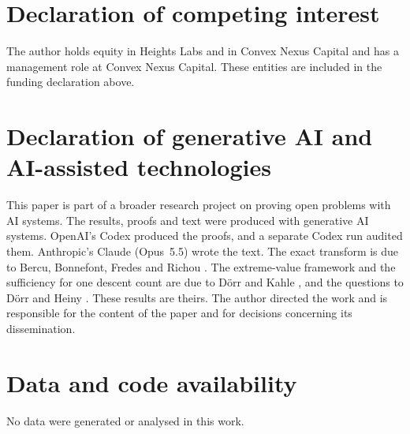\documentclass[11pt]{amsart}
\theoremstyle{remark}
\begin{document}
\section*{Declaration of competing interest}

The author holds equity in Heights Labs and in Convex Nexus Capital and has a management role at Convex Nexus Capital. These entities are included in the funding declaration above.

\section*{Declaration of generative AI and AI-assisted technologies}

This paper is part of a broader research project on proving open problems with AI systems. The results, proofs and text were produced with generative AI systems. OpenAI's Codex produced the proofs, and a separate Codex run audited them. Anthropic's Claude (Opus~5.5) wrote the text. The exact transform is due to Bercu, Bonnefont, Fredes and Richou \cite{BBFR24}. The extreme-value framework and the sufficiency for one descent count are due to D\"orr and Kahle \cite{DK24}, and the questions to D\"orr and Heiny \cite{DH25}. These results are theirs. The author directed the work and is responsible for the content of the paper and for decisions concerning its dissemination.

\section*{Data and code availability}

No data were generated or analysed in this work.
\end{document}
